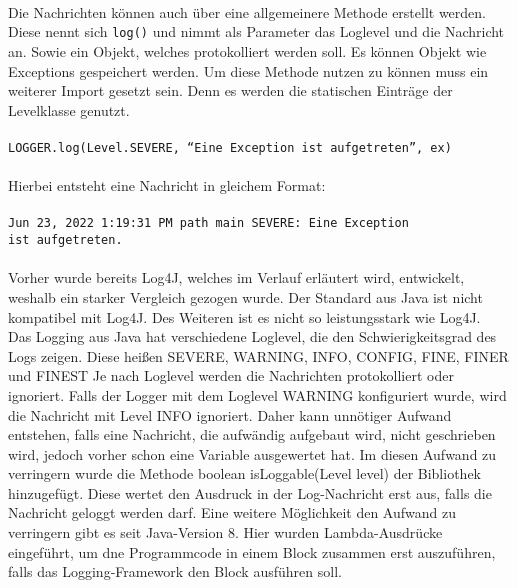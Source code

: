 {    \\
    \\
    \\
    Die Nachrichten können auch über eine allgemeinere Methode erstellt werden.
    Diese nennt sich \texttt{log()} und nimmt als Parameter das Loglevel und die Nachricht an.
    Sowie ein Objekt, welches protokolliert werden soll.
    Es können Objekt wie Exceptions gespeichert werden.
    Um diese Methode nutzen zu können muss ein weiterer Import gesetzt sein.
    Denn es werden die statischen Einträge der Levelklasse genutzt.
    \\
    \\
    \hspace*{10mm}
    \texttt{LOGGER.log(Level.SEVERE, \enquote{Eine Exception ist aufgetreten}, ex)}
    \\
    \\
    Hierbei entsteht eine Nachricht in gleichem Format:
    \\
    \\
    \hspace*{10mm}
    \texttt{Jun 23, 2022 1:19:31 PM path main SEVERE: Eine Exception
    \\
    \hspace*{30mm} ist aufgetreten.}
    \\
    \\
    Vorher wurde bereits Log4J, welches im Verlauf erläutert wird, entwickelt, weshalb ein starker Vergleich gezogen wurde.
    Der Standard aus Java ist nicht kompatibel mit Log4J.
    Des Weiteren ist es nicht so leistungsstark wie Log4J.
    \\
    Das Logging aus Java hat verschiedene Loglevel, die den Schwierigkeitsgrad des Logs zeigen.
    Diese heißen SEVERE, WARNING, INFO, CONFIG, FINE, FINER und FINEST
    Je nach Loglevel werden die Nachrichten protokolliert oder ignoriert.
    Falls der Logger mit dem Loglevel WARNING konfiguriert wurde, wird die Nachricht mit Level INFO ignoriert.
    Daher kann unnötiger Aufwand entstehen, falls eine Nachricht, die aufwändig aufgebaut wird, nicht geschrieben wird, jedoch vorher schon eine Variable ausgewertet hat.
    Im diesen Aufwand zu verringern wurde die Methode boolean isLoggable(Level level) der Bibliothek hinzugefügt.
    Diese wertet den Ausdruck in der Log-Nachricht erst aus, falls die Nachricht geloggt werden darf.
    Eine weitere Möglichkeit den Aufwand zu verringern gibt es seit Java-Version 8.
    Hier wurden Lambda-Ausdrücke eingeführt, um dne Programmcode in einem Block zusammen erst auszuführen, falls das Logging-Framework den Block ausführen soll.
}

